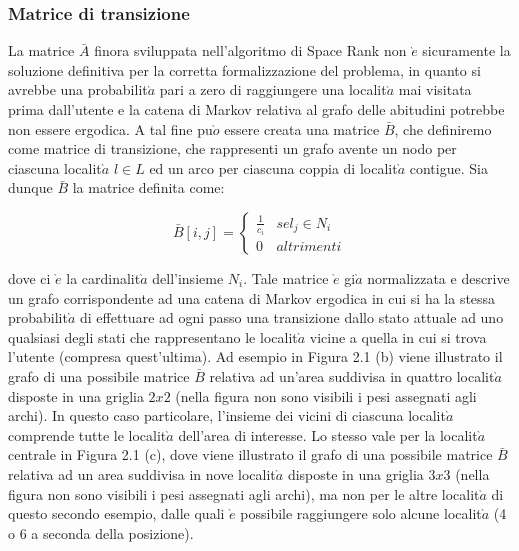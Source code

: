 \subsubsection{Matrice di transizione}
La matrice $\bar{A}$ finora sviluppata nell'algoritmo di Space Rank non $\grave{e}$ sicuramente
la soluzione definitiva per la corretta formalizzazione del problema, in quanto
si avrebbe una probabilit$\grave{a}$ pari a zero di raggiungere una localit$\grave{a}$ mai visitata
prima dall'utente e la catena di Markov relativa al grafo delle abitudini
potrebbe non essere ergodica. A tal fine pu$\grave{o}$ essere creata una matrice $\bar{B}$,
che definiremo come matrice di transizione, che rappresenti un grafo avente
un nodo per ciascuna localit$\grave{a}$ $l \in L$ ed un arco per ciascuna coppia di localit$\grave{a}$
contigue. Sia dunque $\bar{B}$ la matrice definita come:

\begin{equation}
\bar{B}[i,j] =
\left\{\begin{matrix}
\frac{1}{c_{i}} & se l_{j} \in N_{i}\\
0 & altrimenti
\end{matrix}\right.
\end{equation}

dove ci $\grave{e}$ la cardinalit$\grave{a}$ dell'insieme $N_{i}$. Tale matrice $\grave{e}$ gi$\grave{a}$ normalizzata e
descrive un grafo corrispondente ad una catena di Markov ergodica in cui si
ha la stessa probabilit$\grave{a}$ di effettuare ad ogni passo una transizione dallo stato
attuale ad uno qualsiasi degli stati che rappresentano le localit$\grave{a}$ vicine a quella
in cui si trova l'utente (compresa quest'ultima).
Ad esempio in Figura 2.1 (b) viene illustrato il grafo di una possibile matrice
$\bar{B}$ relativa ad un'area suddivisa in quattro localit$\grave{a}$ disposte in una griglia
$2 x 2$ (nella figura non sono visibili i pesi assegnati agli archi). In questo caso
particolare, l'insieme dei vicini di ciascuna localit$\grave{a}$ comprende tutte le localit$\grave{a}$
dell'area di interesse. Lo stesso vale per la localit$\grave{a}$ centrale in Figura 2.1 (c),
dove viene illustrato il grafo di una possibile matrice $\bar{B}$ relativa ad un area
suddivisa in nove localit$\grave{a}$ disposte in una griglia $3 x 3$ (nella figura non sono
visibili i pesi assegnati agli archi), ma non per le altre localit$\grave{a}$ di questo secondo
esempio, dalle quali $\grave{e}$ possibile raggiungere solo alcune localit$\grave{a}$ (4 o 6 a seconda
della posizione).

